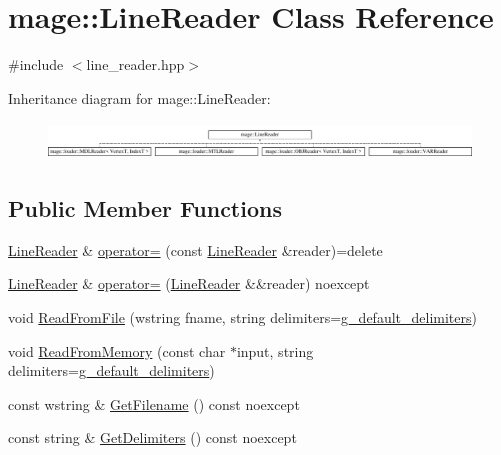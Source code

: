 \hypertarget{classmage_1_1_line_reader}{}\section{mage\+:\+:Line\+Reader Class Reference}
\label{classmage_1_1_line_reader}


{\ttfamily \#include $<$line\+\_\+reader.\+hpp$>$}

Inheritance diagram for mage\+:\+:Line\+Reader\+:\begin{figure}[H]
\begin{center}
\leavevmode
\includegraphics[height=1.000000cm]{classmage_1_1_line_reader}
\end{center}
\end{figure}
\subsection*{Public Member Functions}
\begin{DoxyCompactItemize}
\item 
\hyperlink{classmage_1_1_line_reader}{Line\+Reader} \& \hyperlink{classmage_1_1_line_reader_a2247078d0b5602f9a9a6b74019832faf}{operator=} (const \hyperlink{classmage_1_1_line_reader}{Line\+Reader} \&reader)=delete
\item 
\hyperlink{classmage_1_1_line_reader}{Line\+Reader} \& \hyperlink{classmage_1_1_line_reader_a3ba691cb32a1ab5dcbe75498068c1b86}{operator=} (\hyperlink{classmage_1_1_line_reader}{Line\+Reader} \&\&reader) noexcept
\item 
void \hyperlink{classmage_1_1_line_reader_a6ee0c53351656ac4cd92db1d7c372cff}{Read\+From\+File} (wstring fname, string delimiters=\hyperlink{namespacemage_a6879c3f0af5374a14ec980588b74061d}{g\+\_\+default\+\_\+delimiters})
\item 
void \hyperlink{classmage_1_1_line_reader_a35ceefa0efd4ccfc3c1401715c0934de}{Read\+From\+Memory} (const char $\ast$input, string delimiters=\hyperlink{namespacemage_a6879c3f0af5374a14ec980588b74061d}{g\+\_\+default\+\_\+delimiters})
\item 
const wstring \& \hyperlink{classmage_1_1_line_reader_a682ed8030c99a62d4409a01f9efa6d6b}{Get\+Filename} () const noexcept
\item 
const string \& \hyperlink{classmage_1_1_line_reader_aa00e1e27b614e11ec9f70e52d0bac551}{Get\+Delimiters} () const noexcept
\end{DoxyCompactItemize}
